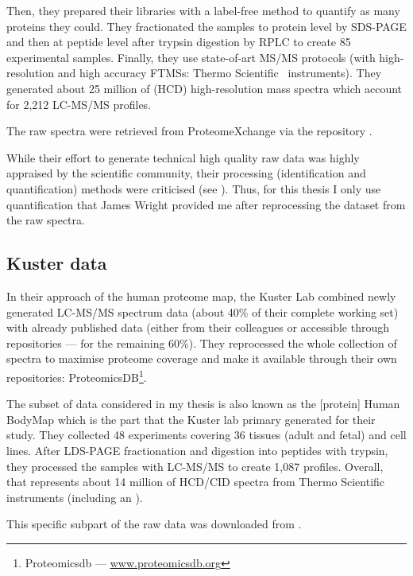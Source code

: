 Then, they prepared their libraries with a label-free method to quantify
as many proteins they could. They fractionated the samples to protein level by
\gls{SDS-PAGE} and then at peptide level after trypsin digestion by \gls{RPLC}
to create 85 experimental samples. Finally, they use state-of-art \gls{MS/MS}
protocols (with high-resolution and high accuracy \glspl{FTMS}:
Thermo Scientific \orbi\ instruments).
They generated about 25 million of (\gls{HCD})
high-resolution mass spectra which account for 2,212 \gls{LC-MS/MS} profiles.

The raw spectra were retrieved from ProteomeXchange via the repository
.

While their effort to generate technical high quality raw data was highly
appraised by the scientific community, their processing
(identification and quantification) methods were
criticised (see ).
Thus, for this thesis I only use
quantification that James Wright provided me after reprocessing the dataset
from the raw spectra.

\subsection{Kuster data}

In their approach of the human proteome map, the Kuster Lab 
combined newly generated \gls{LC-MS/MS} spectrum data (about 40\% of their
complete working set) with already published data (either from their colleagues
or accessible through repositories --- for the remaining 60\%). They reprocessed
the whole collection of spectra to maximise proteome coverage
and make it available through their own repositories: ProteomicsDB\footnote{%
Proteomicsdb --- %
\href{https://www.proteomicsdb.org/}{www.proteomicsdb.org}}.

The subset of data considered in my thesis is also
known as the [protein] Human BodyMap which is the part that the Kuster lab
primary generated for their study. They collected 48 experiments covering 36
tissues (adult and fetal) and cell lines. After \gls{LDS-PAGE} fractionation and
digestion into peptides with trypsin, they processed the samples with
\gls{LC-MS/MS} to create 1,087 profiles.  Overall, that represents about
14 million of \gls{HCD}/\gls{CID} spectra from Thermo Scientific instruments
(including an \orbi).

This specific subpart of the raw data was downloaded from .

